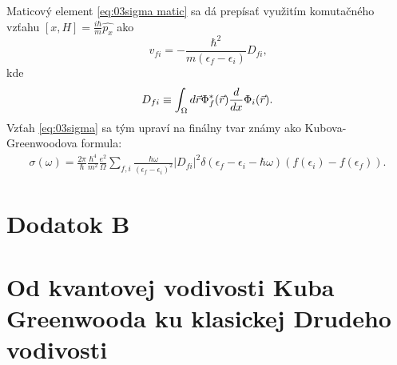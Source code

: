 Maticový element \eqref{eq:03sigma matic} sa dá prepísať využitím komutačného vzťahu $[x,H]=\frac{i\hbar}{m}\hat{p_x}$ ako
\begin{equation}
v_{fi}=-\frac{\hbar^{2}}{m(\epsilon_f-\epsilon_i)}D_{fi} \text{,}
\end{equation}
kde
\begin{equation}
\label{eq:03matrix_element}
D_{fi} \equiv \int_{\Omega}d\vec{r}\Phi_f^*(\vec{r})\frac{d}{dx}\Phi_i(\vec{r}) \text{.}
\end{equation}
Vzťah \eqref{eq:03sigma} sa tým upraví na finálny tvar známy ako Kubova-Greenwoodova formula:
\begin{align}
\label{eq:03sigma2}
\sigma(\omega)=
\frac{2\pi}{\hbar}\frac{\hbar^{4}}{m^2}\frac{e^2}{\Omega}
\sum_{f,i}\frac{\hbar\omega}{(\epsilon_f-\epsilon_i)^2}|D_{fi}|^2\delta(\epsilon_f-\epsilon_i-\hbar\omega)(f(\epsilon_i)-f(\epsilon_f))\text{.}
\end{align}



  \section*{Dodatok B}

\section{Od kvantovej vodivosti Kuba Greenwooda ku klasickej Drudeho vodivosti}
\label{sec:kubo B}


